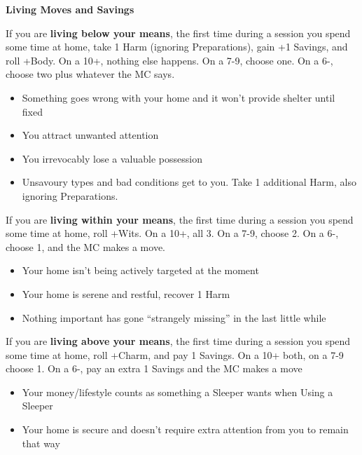 \documentclass[letterpaper,10pt]{article}
\newenvironment{move}{}{}
\newcommand{\TRIGGER}[1]{\textbf{#1}}
\newcommand{\TITLE}[1]{\begin{center}{\titlefont\Huge\textbf{#1}}\end{center}}
\begin{document}
\TITLE{Living Moves and Savings}

\begin{multicols}{2}

\begin{move}
  If you are \TRIGGER{living below your means}, the first time during
  a session you spend some time at home, take 1 Harm (ignoring
  Preparations), gain +1 Savings, and roll +Body. On a 10+, nothing
  else happens. On a 7-9, choose one. On a 6-, choose two plus
  whatever the MC says.
  \begin{itemize}
  \item Something goes wrong with your home and it won't provide
    shelter until fixed
  \item You attract unwanted attention
  \item You irrevocably lose a valuable possession
  \item Unsavoury types and bad conditions get to you. Take 1
    additional Harm, also ignoring Preparations.
  \end{itemize}
\end{move}

\bigskip

\begin{move}
  If you are \TRIGGER{living within your means}, the first time during
  a session you spend some time at home, roll +Wits. On a 10+, all
  3. On a 7-9, choose 2. On a 6-, choose 1, and the MC makes a move.
  \begin{itemize}
  \item Your home isn't being actively targeted at the moment
  \item Your home is serene and restful, recover 1 Harm
  \item Nothing important has gone ``strangely missing'' in the last
    little while
  \end{itemize}
\end{move}

\bigskip

\begin{move}
  If you are \TRIGGER{living above your means}, the first time during
  a session you spend some time at home, roll +Charm, and pay 1
  Savings. On a 10+ both, on a 7-9 choose 1. On a 6-, pay an extra 1
  Savings and the MC makes a move
  \begin{itemize}
    \item Your money/lifestyle counts as something a Sleeper wants
      when Using a Sleeper
    \item Your home is secure and doesn't require extra attention from
      you to remain that way
  \end{itemize}
\end{move}


\end{multicols}
\end{document}
